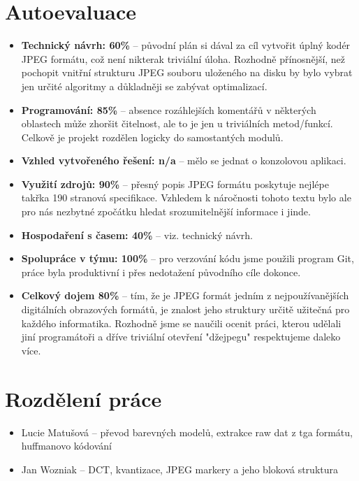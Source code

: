 \documentclass[11pt,a4paper]{article}
\begin{document}
\section{Autoevaluace}
\begin{itemize}
\item \textbf{Technický návrh: 60\%} -- původní plán si dával za cíl vytvořit úplný kodér JPEG formátu, což
				není nikterak triviální úloha. Rozhodně přínosnější, než pochopit vnitřní strukturu JPEG
				souboru uloženého na disku by bylo vybrat jen určité algoritmy a důkladněji se zabývat
				optimalizací.
\item \textbf{Programování: 85\%} -- absence rozáhlejších komentářů v některých oblastech může zhoršit čitelnost,
				ale to je jen u triviálních metod/funkcí. Celkově je projekt rozdělen logicky do samostantých
				modulů.
\item \textbf{Vzhled vytvořeného řešení: n/a} -- mělo se jednat o konzolovou aplikaci.
\item \textbf{Využití zdrojů: 90\%} -- přesný popis JPEG formátu poskytuje nejlépe takřka 190 stranová 
				specifikace. Vzhledem k náročnosti tohoto textu bylo ale pro nás nezbytné zpočátku hledat 
				srozumitelnější	informace i jinde.
\item \textbf{Hospodaření s časem: 40\%} -- viz. technický návrh.
\item \textbf{Spolupráce v týmu: 100\%} -- pro verzování kódu jsme použili program Git, práce byla produktivní
				i přes nedotažení původního cíle dokonce.
\item \textbf{Celkový dojem 80\%} -- tím, že je JPEG formát jedním z nejpoužívanějších digitálních obrazových
				formátů, je znalost jeho struktury určitě užitečná pro každého informatika. Rozhodně
				jsme se naučili ocenit práci, kterou udělali jiní programátoři a dříve triviální otevření
				"džejpegu" respektujeme daleko více.
			
\end{itemize}

\section{Rozdělení práce}
\begin{itemize}
\item Lucie Matušová -- převod barevných modelů, extrakce raw dat z tga formátu, huffmanovo kódování
\item Jan Wozniak -- DCT, kvantizace, JPEG markery a jeho bloková struktura
\end{itemize}
\end{document}

